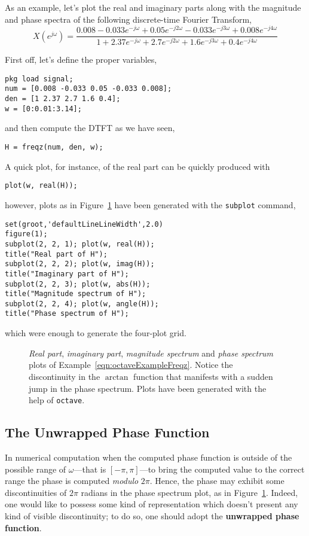 \documentclass[\documentfontsize, twocolumn]{\classname}
\begin{document}
As an example, let's plot the real and imaginary parts along with the magnitude and phase spectra of the following discrete-time Fourier Transform,
\begin{equation}\label{eqn:octaveExampleFreqz}
    X(e^{j\omega}) = \frac
    {0.008 - 0.033e^{-j\omega} + 0.05e^{-j2\omega} - 0.033e^{-j3\omega} + 0.008e^{-j4\omega}}
    {1 + 2.37e^{-j\omega} + 2.7e^{-j2\omega} + 1.6e^{-j3\omega} + 0.4e^{-j4\omega}}
\end{equation}

First off, let's define the proper variables,
\begin{verbatim}
pkg load signal;
num = [0.008 -0.033 0.05 -0.033 0.008];
den = [1 2.37 2.7 1.6 0.4];
w = [0:0.01:3.14];
\end{verbatim}
and then compute the DTFT as we have seen,
\begin{verbatim}
H = freqz(num, den, w);
\end{verbatim}

A quick plot, for instance, of the real part can be quickly produced with
\begin{verbatim}
plot(w, real(H));
\end{verbatim}
however, plots as in Figure~\ref{oct:octaveExampleFreqz} have been generated with the \texttt{subplot} command,
\begin{verbatim}
set(groot,'defaultLineLineWidth',2.0)
figure(1);
subplot(2, 2, 1); plot(w, real(H));
title("Real part of H");
subplot(2, 2, 2); plot(w, imag(H));
title("Imaginary part of H");
subplot(2, 2, 3); plot(w, abs(H));
title("Magnitude spectrum of H");
subplot(2, 2, 4); plot(w, angle(H));
title("Phase spectrum of H");
\end{verbatim}
which were enough to generate the four-plot grid.

\begin{figure}[ht]
    \begin{center}
\scalebox{0.6}{

}\caption{\emph{Real part}, \emph{imaginary part}, \emph{magnitude spectrum} and \emph{phase spectrum} plots of Example~\ref{eqn:octaveExampleFreqz}. Notice the discontinuity in the $\arctan{}$ function that manifests with a sudden jump in the phase spectrum. Plots have been generated with the help of \texttt{octave}.}\label{oct:octaveExampleFreqz}
    \end{center}
\end{figure}
\clearpage

\subsection{The Unwrapped Phase Function}
In numerical computation when the computed phase function is outside of the possible range of $\omega$---that is $[-\pi, \pi]$---to bring the computed value to the correct range the phase is computed \emph{modulo} $2\pi$. Hence, the phase may exhibit some discontinuities of $2\pi$ radians in the phase spectrum plot, as in Figure~\ref{oct:octaveExampleFreqz}. Indeed, one would like to possess some kind of representation which doesn't present any kind of visible discontinuity; to do so, one should adopt the \textbf{unwrapped phase function}.
\end{document}

